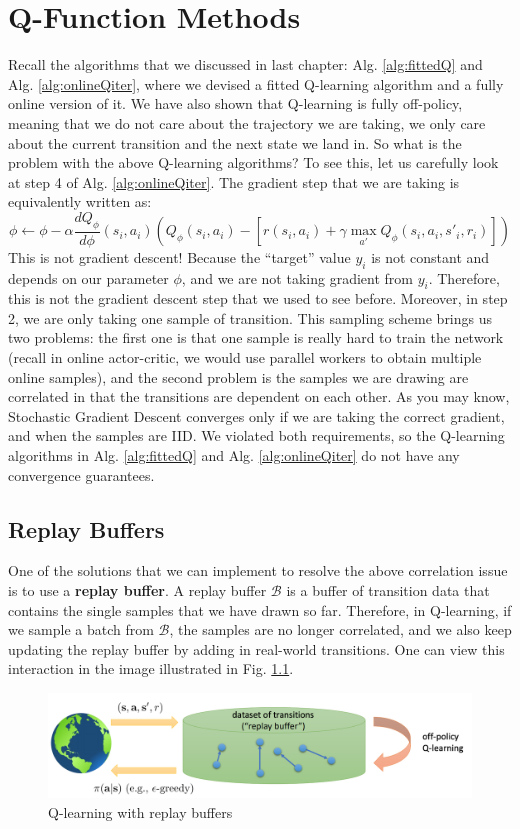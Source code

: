 \chapter{Q-Function Methods}
Recall the algorithms that we discussed in last chapter: Alg. \ref{alg:fittedQ} and Alg. \ref{alg:onlineQiter}, where we devised a fitted Q-learning algorithm and a fully online version of it. We have also shown that Q-learning is fully off-policy, meaning that we do not care about the trajectory we are taking, we only care about the current transition and the next state we land in. So what is the problem with the above Q-learning algorithms? To see this, let us carefully look at step 4 of Alg. \ref{alg:onlineQiter}. The gradient step that we are taking is equivalently written as:
$$\phi\leftarrow \phi - \alpha\frac{dQ_\phi}{d\phi}(s_i,a_i)\left(Q_\phi(s_i,a_i) - \left[r(s_i,a_i)+\gamma\max_{a'}Q_\phi(s_i,a_i,s'_i,r_i)\right]\right)$$
This is not gradient descent! Because the ``target'' value $y_i$ is not constant and depends on our parameter $\phi$, and we are not taking gradient from $y_i$. Therefore, this is not the gradient descent step that we used to see before. Moreover, in step 2, we are only taking one sample of transition. This sampling scheme brings us two problems: the first one is that one sample is really hard to train the network (recall in online actor-critic, we would use parallel workers to obtain multiple online samples), and the second problem is the samples we are drawing are correlated in that the transitions are dependent on each other. As you may know, Stochastic Gradient Descent converges only if we are taking the correct gradient, and when the samples are IID. We violated both requirements, so the Q-learning algorithms in Alg. \ref{alg:fittedQ} and Alg. \ref{alg:onlineQiter} do not have any convergence guarantees. 

\section{Replay Buffers}
One of the solutions that we can implement to resolve the above correlation issue is to use a \textbf{replay buffer}. A replay buffer $\mathcal{B}$ is a buffer of transition data that contains the single samples that we have drawn so far. Therefore, in Q-learning, if we sample a batch from $\mathcal{B}$, the samples are no longer correlated, and we also keep updating the replay buffer by adding in real-world transitions. One can view this interaction in the image illustrated in Fig. \ref{fig:qwfb}.
\begin{figure}
    \centering
    \includegraphics[scale=0.5]{figures/qwrb.png}
    \caption{Q-learning with replay buffers}
    \label{fig:qwfb}
\end{figure}


